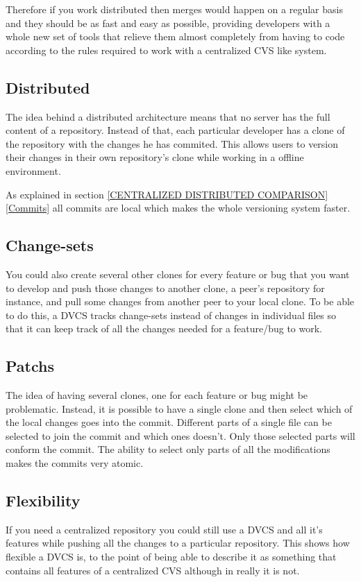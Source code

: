 \documentclass[a4paper,10pt]{article}
\newcommand{\sectionReference}[1]{\hspace{-.25em}\ref{#1}\hspace{.5em}}
\begin{document}
Therefore if you work distributed then merges would happen on a regular basis and they should be as fast and easy as possible, providing developers with a whole new set of tools that relieve them almost completely from having to code according to the rules required to work with a centralized CVS like system. 
\subsection{Distributed}
The idea behind a distributed architecture means that no server has the full content of a repository. Instead of that, each 
particular developer has a clone of the repository with the changes he has commited. 
This allows users to version their changes in their own repository's clone while working in a offline environment.

As explained in section \sectionReference{CENTRALIZED DISTRIBUTED COMPARISON}  \sectionReference{Commits} all commits are local which makes the whole versioning system faster.



\subsection{Change-sets}
You could also create several other clones for every feature or bug that you want to develop and push those changes to another clone, a peer's repository for instance, and pull some changes from another peer to your local clone. To be able to do this, a DVCS tracks change-sets instead of changes in individual files so that it can keep track of all the changes needed for a feature/bug to work.


\subsection{Patchs}
The idea of having several clones, one for each feature or bug might be problematic. Instead, it is possible to have a single clone and then select
which of the local changes goes into the commit. Different parts of a single file can be selected to join the commit and which ones doesn't. Only those selected parts will conform the commit. The ability to select only parts of all the modifications makes the commits very atomic.


\subsection{Flexibility}
If you need a centralized repository you could still use a DVCS and all it's features while pushing all the changes to a particular repository. This shows how flexible a DVCS is, to the point of being able to describe it as something that contains all features of a centralized CVS although in really it is not.
\end{document}
